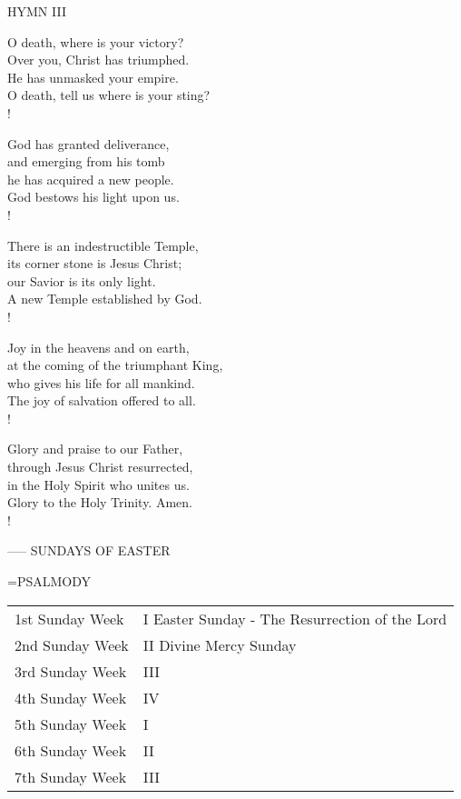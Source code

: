 \noindent\small{\uppercase{Hymn III}}\normalsize
\begin{cverse}
O death, where is your victory?\\
Over you, Christ has triumphed.\\
He has unmasked your empire.\\
O death, tell us where is your sting?\\!

God has granted deliverance, \\
and emerging from his tomb\\
he has acquired a new people.\\
God bestows his light upon us.\\!

There is an indestructible Temple,\\
its corner stone is Jesus Christ;\\
our Savior is its only light.\\
A new Temple established by God.\\!

Joy in the heavens and on earth,\\
at the coming of the triumphant King,\\
who gives his life for all mankind.\\
The joy of salvation offered to all.\\!

Glory and praise to our Father,\\
through Jesus Christ resurrected,\\
in the Holy Spirit who unites us.\\
Glory to the Holy Trinity. Amen.\\!
\end{cverse}
-----
SUNDAYS OF EASTER

\hangindent=\parindent \small{PSALMODY}
\begin{center}
\begin{tabular}{ l l }
1st Sunday		Week &  I	Easter Sunday - The Resurrection of the Lord\\
2nd Sunday		Week &  II	Divine Mercy Sunday\\
3rd Sunday		Week &  III\\
4th Sunday		Week &  IV\\
5th Sunday		Week &  I\\
6th Sunday		Week &  II\\
7th Sunday		Week &  III\\
\end{tabular}
\end{center}		


